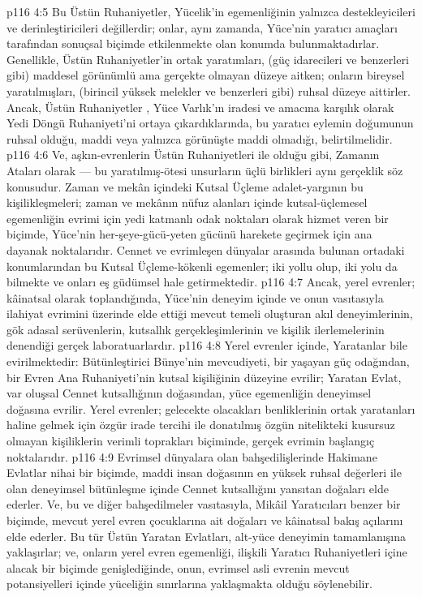 \vs p116 4:5 Bu Üstün Ruhaniyetler, Yücelik’in egemenliğinin yalnızca destekleyicileri ve derinleştiricileri değillerdir; onlar, aynı zamanda, Yüce’nin yaratıcı amaçları tarafından sonuçsal biçimde etkilenmekte olan konumda bulunmaktadırlar. Genellikle, Üstün Ruhaniyetler’in ortak yaratımları, (güç idarecileri ve benzerleri gibi) maddesel görünümlü ama gerçekte olmayan düzeye aitken; onların bireysel yaratılmışları, (birincil yüksek melekler ve benzerleri gibi) ruhsal düzeye aittirler. Ancak, Üstün Ruhaniyetler , Yüce Varlık’ın iradesi ve amacına karşılık olarak Yedi Döngü Ruhaniyeti’ni ortaya çıkardıklarında, bu yaratıcı eylemin doğumunun ruhsal olduğu, maddi veya yalnızca görünüşte maddi olmadığı, belirtilmelidir.
\vs p116 4:6 Ve, aşkın\hyp{}evrenlerin Üstün Ruhaniyetleri ile olduğu gibi, Zamanın Ataları olarak --- bu yaratılmış\hyp{}ötesi unsurların üçlü birlikleri aynı gerçeklik söz konusudur. Zaman ve mekân içindeki Kutsal Üçleme adalet\hyp{}yargının bu kişilikleşmeleri; zaman ve mekânın nüfuz alanları içinde kutsal\hyp{}üçlemesel egemenliğin evrimi için yedi katmanlı odak noktaları olarak hizmet veren bir biçimde, Yüce’nin her\hyp{}şeye\hyp{}gücü\hyp{}yeten gücünü harekete geçirmek için ana dayanak noktalarıdır. Cennet ve evrimleşen dünyalar arasında bulunan ortadaki konumlarından bu Kutsal Üçleme\hyp{}kökenli egemenler; iki yollu olup, iki yolu da bilmekte ve onları eş güdümsel hale getirmektedir.
\vs p116 4:7 Ancak, yerel evrenler; kâinatsal olarak toplandığında, Yüce’nin deneyim içinde ve onun vasıtasıyla ilahiyat evrimini üzerinde elde ettiği mevcut temeli oluşturan akıl deneyimlerinin, gök adasal serüvenlerin, kutsallık gerçekleşimlerinin ve kişilik ilerlemelerinin denendiği gerçek laboratuarlardır.
\vs p116 4:8 Yerel evrenler içinde, Yaratanlar bile evirilmektedir: Bütünleştirici Bünye’nin mevcudiyeti, bir yaşayan güç odağından, bir Evren Ana Ruhaniyeti’nin kutsal kişiliğinin düzeyine evrilir; Yaratan Evlat, var oluşsal Cennet kutsallığının doğasından, yüce egemenliğin deneyimsel doğasına evrilir. Yerel evrenler; gelecekte olacakları benliklerinin ortak yaratanları haline gelmek için özgür irade tercihi ile donatılmış özgün nitelikteki kusursuz olmayan kişiliklerin verimli toprakları biçiminde, gerçek evrimin başlangıç noktalarıdır.
\vs p116 4:9 Evrimsel dünyalara olan bahşedilişlerinde Hakimane Evlatlar nihai bir biçimde, maddi insan doğasının en yüksek ruhsal değerleri ile olan deneyimsel bütünleşme içinde Cennet kutsallığını yansıtan doğaları elde ederler. Ve, bu ve diğer bahşedilmeler vasıtasıyla, Mikâil Yaratıcıları benzer bir biçimde, mevcut yerel evren çocuklarına ait doğaları ve kâinatsal bakış açılarını elde ederler. Bu tür Üstün Yaratan Evlatları, alt\hyp{}yüce deneyimin tamamlanışına yaklaşırlar; ve, onların yerel evren egemenliği, ilişkili Yaratıcı Ruhaniyetleri içine alacak bir biçimde genişlediğinde, onun, evrimsel asli evrenin mevcut potansiyelleri içinde yüceliğin sınırlarına yaklaşmakta olduğu söylenebilir.
